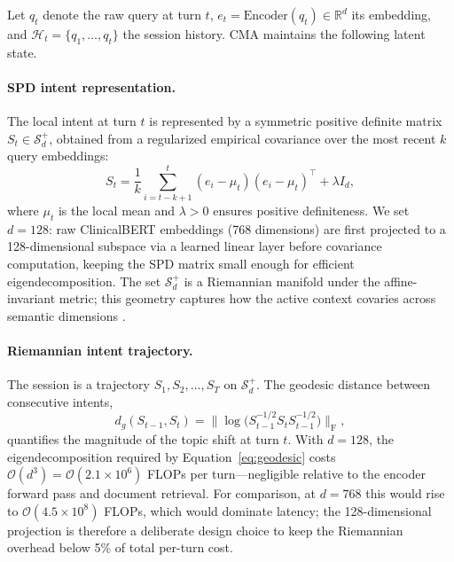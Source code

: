 \documentclass[preprint,12pt]{elsarticle}
\begin{document}
Let $q_t$ denote the raw query at turn $t$, $e_t = \text{Encoder}(q_t) \in \mathbb{R}^d$ its embedding, and $\mathcal{H}_t = \{q_1,\dots,q_t\}$ the session history. CMA maintains the following latent state.

\paragraph{SPD intent representation.} The local intent at turn $t$ is represented by a symmetric positive definite matrix $S_t \in \mathcal{S}_d^+$, obtained from a regularized empirical covariance over the most recent $k$ query embeddings:
\begin{equation}
S_t = \frac{1}{k}\sum_{i=t-k+1}^{t}(e_i-\mu_t)(e_i-\mu_t)^{\top} + \lambda I_d,
\label{eq:spdintent}
\end{equation}
where $\mu_t$ is the local mean and $\lambda>0$ ensures positive definiteness. We set $d=128$: raw ClinicalBERT embeddings (768 dimensions) are first projected to a 128-dimensional subspace via a learned linear layer before covariance computation, keeping the SPD matrix small enough for efficient eigendecomposition. The set $\mathcal{S}_d^+$ is a Riemannian manifold under the affine-invariant metric; this geometry captures how the active context covaries across semantic dimensions \citep{lopez2021,bronstein2017}.

\paragraph{Riemannian intent trajectory.} The session is a trajectory $S_1,S_2,\dots,S_T$ on $\mathcal{S}_d^+$. The geodesic distance between consecutive intents,
\begin{equation}
d_g(S_{t-1},S_t) = \bigl\| \log\bigl(S_{t-1}^{-1/2} S_t S_{t-1}^{-1/2}\bigr) \bigr\|_{\mathrm{F}},
\label{eq:geodesic}
\end{equation}
quantifies the magnitude of the topic shift at turn $t$. With $d=128$, the eigendecomposition required by Equation~\ref{eq:geodesic} costs $\mathcal{O}(d^3)=\mathcal{O}(2.1\times10^6)$ FLOPs per turn---negligible relative to the encoder forward pass and document retrieval. For comparison, at $d=768$ this would rise to $\mathcal{O}(4.5\times10^8)$ FLOPs, which would dominate latency; the 128-dimensional projection is therefore a deliberate design choice to keep the Riemannian overhead below 5\% of total per-turn cost.
\end{document}
